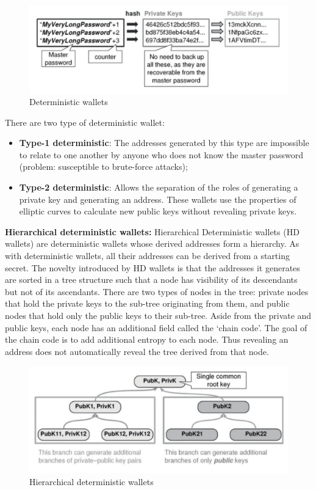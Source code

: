 \documentclass{article}
\begin{document}
\begin{figure}[H]
    \centering
    \includegraphics[width=12cm]{images/12.png}
    \caption{Deterministic wallets}
\end{figure}

\noindent There are two type of deterministic wallet:
\begin{itemize}
    \item \textbf{Type-1 deterministic}: The addresses generated by this type are impossible to relate to one another by anyone who does not know the master password (problem: susceptible to brute-force attacks);
    \item \textbf{Type-2 deterministic}: Allows the separation of the roles of generating a private key and generating an address. These wallets use the properties of elliptic curves to calculate new public keys without revealing private keys.
\end{itemize}
\textbf{Hierarchical deterministic wallets:} Hierarchical Deterministic wallets (HD wallets) are deterministic wallets whose derived addresses form a hierarchy. As with deterministic wallets, all their addresses can be derived from a starting secret. The novelty introduced by HD wallets is that the addresses it generates are sorted in a tree structure such that a node has visibility of its descendants but not of its ascendants. There are two types of nodes in the tree: private nodes that hold the private keys to the sub-tree originating from them, and public nodes that hold only the public keys to their sub-tree. Aside from the private and public keys, each node has an additional field called the ‘chain code’. The goal of the chain code is to add additional entropy to each node. Thus revealing an address does not automatically reveal the tree derived from that node.

\begin{figure}[H]
    \centering
    \includegraphics[width=12cm]{images/13.png}
    \caption{Hierarchical deterministic wallets}
\end{figure}
\end{document}
